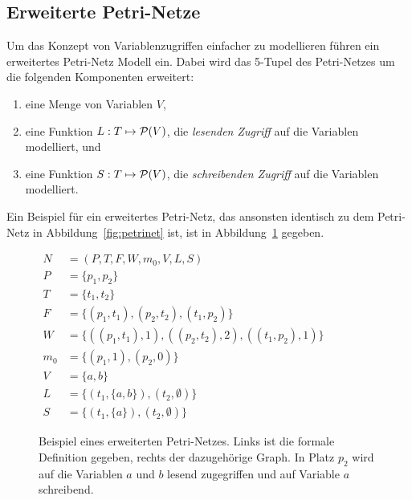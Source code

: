 \subsection{Erweiterte Petri-Netze}
Um das Konzept von Variablenzugriffen einfacher zu modellieren führen \textcite{Goel1990} ein erweitertes Petri-Netz Modell ein. Dabei wird das 5-Tupel des Petri-Netzes um die folgenden Komponenten erweitert:
\begin{enumerate}
	\item eine Menge von Variablen $V$,
	\item eine Funktion $L: T \mapsto \mathcal{P}(V)$, die \emph{lesenden Zugriff} auf die Variablen modelliert, und
	\item eine Funktion $S: T \mapsto \mathcal{P}(V)$, die \emph{schreibenden Zugriff} auf die Variablen modelliert.
\end{enumerate}
Ein Beispiel für ein erweitertes Petri-Netz, das ansonsten identisch zu dem Petri-Netz in Abbildung~\ref{fig:petrinet} ist, ist in Abbildung~\ref{fig:augpetrinet} gegeben.
\begin{figure}
\centering
	\begin{minipage}[c]{.49\textwidth}
		$\begin{aligned}
			N &= (P,T,F,W,m_0, V, L, S)\\
			P &= \{p_1, p_2\}\\
			T &= \{t_1, t_2\}\\
			F &= \{(p_1, t_1), (p_2, t_2), (t_1, p_2)\}\\
			W &= \{((p_1, t_1),1), ((p_2, t_2),2), ((t_1, p_2), 1)\}\\
			m_0 &= \{(p_1, 1), (p_2, 0)\}\\
			V &= \{a,b\}\\
			L &= \{(t_1,\{a,b\}), (t_2,\emptyset)\}\\
			S &= \{(t_1,\{a\}), (t_2,\emptyset)\}
		\end{aligned}$
	\end{minipage}
	\hfill
	\begin{minipage}[c]{.49\textwidth}
	\end{minipage}
	\caption{Beispiel eines erweiterten Petri-Netzes. Links ist die formale Definition gegeben, rechts der dazugehörige Graph. In Platz $p_2$ wird auf die Variablen $a$ und $b$ lesend zugegriffen und auf Variable $a$ schreibend.}\label{fig:augpetrinet}
\end{figure}